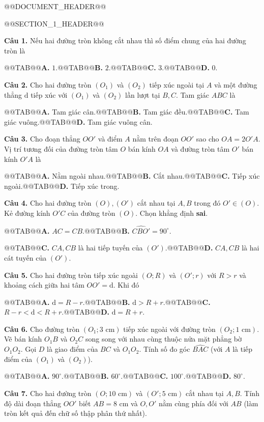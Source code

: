 \documentclass[11pt,a4paper]{article}
\begin{document}
@@DOCUMENT_HEADER@@

@@SECTION_1_HEADER@@

\textbf{Câu 1.} Nếu hai đường tròn không cắt nhau thì số điểm chung của hai đường tròn là

@@TAB@@\textbf{A.} $1$.@@TAB@@\textbf{B.} $2$.@@TAB@@\textbf{C.} $3$.@@TAB@@\textbf{D.} $0$.

\textbf{Câu 2.} Cho hai đường tròn $(O_1)$ và $(O_2)$ tiếp xúc ngoài tại $A$ và một đường thẳng $\mathrm{d}$ tiếp xúc với $(O_1)$ và $(O_2)$ lần lượt tại $B, C$. Tam giác $ABC$ là

@@TAB@@\textbf{A.} Tam giác cân.@@TAB@@\textbf{B.} Tam giác đều.@@TAB@@\textbf{C.} Tam giác vuông.@@TAB@@\textbf{D.} Tam giác vuông cân.

\textbf{Câu 3.} Cho đoạn thẳng $OO'$ và điểm $A$ nằm trên đoạn $OO'$ sao cho $OA = 2O'A$. Vị trí tương đối của đường tròn tâm $O$ bán kính $OA$ và đường tròn tâm $O'$ bán kính $O'A$ là

@@TAB@@\textbf{A.} Nằm ngoài nhau.@@TAB@@\textbf{B.} Cắt nhau.@@TAB@@\textbf{C.} Tiếp xúc ngoài.@@TAB@@\textbf{D.} Tiếp xúc trong.

\textbf{Câu 4.} Cho hai đường tròn $(O), (O')$ cắt nhau tại $A, B$ trong đó $O' \in (O)$. Kẻ đường kính $O'C$ của đường tròn $(O)$. Chọn khẳng định \textbf{sai}.

@@TAB@@\textbf{A.} $AC = CB$.@@TAB@@\textbf{B.} $\widehat{CBO'} = 90^\circ$.

@@TAB@@\textbf{C.} $CA, CB$ là hai tiếp tuyến của $(O')$.@@TAB@@\textbf{D.} $CA, CB$ là hai cát tuyến của $(O')$.

\textbf{Câu 5.} Cho hai đường tròn tiếp xúc ngoài $(O; R)$ và $(O'; r)$ với $R > r$ và khoảng cách giữa hai tâm $OO' = \mathrm{d}$. Khi đó

@@TAB@@\textbf{A.} $\mathrm{d} = R - r$.@@TAB@@\textbf{B.} $\mathrm{d} > R + r$.@@TAB@@\textbf{C.} $R - r < \mathrm{d} < R + r$.@@TAB@@\textbf{D.} $\mathrm{d} = R + r$.

\textbf{Câu 6.} Cho đường tròn $(O_1; 3\text{ cm})$ tiếp xúc ngoài với đường tròn $(O_2; 1\text{ cm})$. Vẽ bán kính $O_1B$ và $O_2C$ song song với nhau cùng thuộc nửa mặt phẳng bờ $O_1O_2$. Gọi $D$ là giao điểm của $BC$ và $O_1O_2$. Tính số đo góc $\widehat{BAC}$ (với $A$ là tiếp điểm của $(O_1)$ và $(O_2)$).

@@TAB@@\textbf{A.} $90^\circ$.@@TAB@@\textbf{B.} $60^\circ$.@@TAB@@\textbf{C.} $100^\circ$.@@TAB@@\textbf{D.} $80^\circ$.

\textbf{Câu 7.} Cho hai đường tròn $(O; 10\text{ cm})$ và $(O'; 5\text{ cm})$ cắt nhau tại $A, B$. Tính độ dài đoạn thẳng $OO'$ biết $AB = 8\text{ cm}$ và $O, O'$ nằm cùng phía đối với $AB$ (làm tròn kết quả đến chữ số thập phân thứ nhất).
\end{document}
